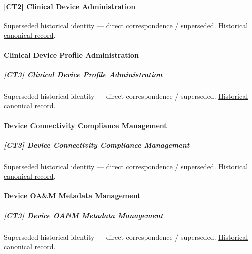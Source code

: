 \paragraph{[CT2] Clinical Device Administration}

\par\label{element:3792be10541e4d68b3f740b1ba964966}
Superseded historical identity — direct correspondence / superseded. \href{../../../../continuum/strategy/capability/3792be10541e4d68b3f740b1ba964966.md}{Historical canonical record}.\par

\paragraph{Clinical Device Profile Administration}

\subparagraph{[CT3] Clinical Device Profile Administration}

\par\label{element:e8c72952da144d6883caba7fd2afb88d}
Superseded historical identity — direct correspondence / superseded. \href{../../../../continuum/strategy/capability/e8c72952da144d6883caba7fd2afb88d.md}{Historical canonical record}.\par

\paragraph{Device Connectivity Compliance Management}

\subparagraph{[CT3] Device Connectivity Compliance Management}

\par\label{element:9225f083d3474715a75af2a827a4016d}
Superseded historical identity — direct correspondence / superseded. \href{../../../../continuum/strategy/capability/9225f083d3474715a75af2a827a4016d.md}{Historical canonical record}.\par

\paragraph{Device OA\&M Metadata Management}

\subparagraph{[CT3] Device OA\&M Metadata Management}

\par\label{element:a398c72bef094dee96c96d97994449fb}
Superseded historical identity — direct correspondence / superseded. \href{../../../../continuum/strategy/capability/a398c72bef094dee96c96d97994449fb.md}{Historical canonical record}.\par

